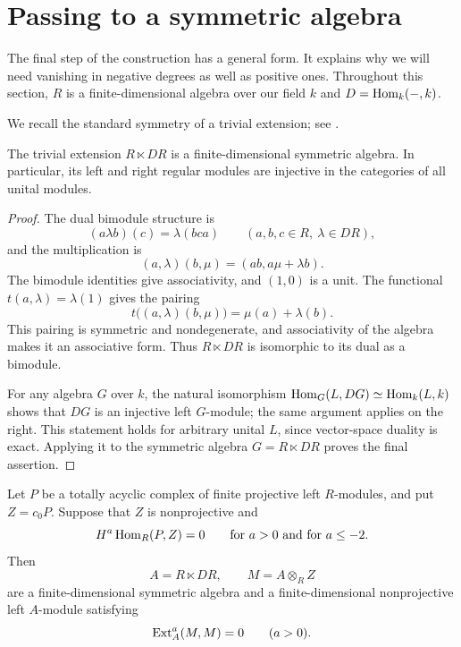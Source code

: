 \section{Passing to a symmetric algebra}\label{sec:transfer}

The final step of the construction has a general form.  It explains why
we will need vanishing in negative degrees as well as positive ones.
Throughout this section, $R$ is a finite-dimensional algebra over our
field $k$ and $D=\operatorname{Hom}_k(-,k)$.

We recall the standard symmetry of a trivial extension; see
\cite[Proposition~3.1]{BessenrodtHolmZimmermann2007}.

\begin{lemma}\label{tr:trivial-symmetric}
The trivial extension $R\ltimes DR$ is a finite-dimensional symmetric
algebra.  In particular, its left and right regular modules are
injective in the categories of all unital modules.
\end{lemma}

\begin{proof}
The dual bimodule structure is
\[
 (a\lambda b)(c)=\lambda(bca)
 \qquad(a,b,c\in R,\ \lambda\in DR),
\]
and the multiplication is
\[
 (a,\lambda)(b,\mu)=(ab,a\mu+\lambda b).
\]
The bimodule identities give associativity, and $(1,0)$ is a unit.
The functional $t(a,\lambda)=\lambda(1)$ gives the pairing
\[
 t\big((a,\lambda)(b,\mu)\big)=\mu(a)+\lambda(b).
\]
This pairing is symmetric and nondegenerate, and associativity of the
algebra makes it an associative form.  Thus $R\ltimes DR$ is isomorphic
to its dual as a bimodule.

For any algebra $G$ over $k$, the natural isomorphism
$\operatorname{Hom}_G(L,DG)\simeq\operatorname{Hom}_k(L,k)$ shows that $DG$ is an injective left
$G$-module; the same argument applies on the right.  This statement
holds for arbitrary unital $L$, since vector-space duality is exact.
Applying it to the symmetric algebra $G=R\ltimes DR$ proves the final
assertion.
\end{proof}

\begin{proposition}
\label{tr:transfer}
Let $P$ be a totally acyclic complex of finite projective left
$R$-modules, and put $Z=c_0P$.  Suppose that $Z$ is nonprojective and
\begin{equation}\label{tr:two-sided-vanishing}
 H^a\operatorname{Hom}_R(P,Z)=0
 \qquad\text{for }a>0\text{ and for }a\leq -2.
\end{equation}
Then
\[
 A=R\ltimes DR,\qquad M=A\otimes_R Z
\]
are a finite-dimensional symmetric algebra and a finite-dimensional
nonprojective left $A$-module satisfying
\[
 \operatorname{Ext}_A^a(M,M)=0\qquad(a>0).
\]
\end{proposition}

